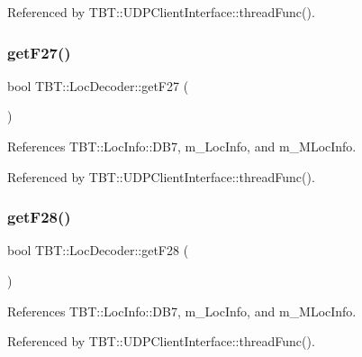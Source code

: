 Referenced by T\+B\+T\+::\+U\+D\+P\+Client\+Interface\+::thread\+Func().

\mbox{\label{classTBT_1_1LocDecoder_a0f8abd84b95094b2a139bd3402153aae_a0f8abd84b95094b2a139bd3402153aae}} 
\subsubsection{\texorpdfstring{get\+F27()}{getF27()}}
{\footnotesize\ttfamily bool T\+B\+T\+::\+Loc\+Decoder\+::get\+F27 (\begin{DoxyParamCaption}{ }\end{DoxyParamCaption})\hspace{0.3cm}{\ttfamily [inline]}}



References T\+B\+T\+::\+Loc\+Info\+::\+D\+B7, m\+\_\+\+Loc\+Info, and m\+\_\+\+M\+Loc\+Info.



Referenced by T\+B\+T\+::\+U\+D\+P\+Client\+Interface\+::thread\+Func().

\mbox{\label{classTBT_1_1LocDecoder_aecb2127b4edc17aac10dda93b4404e1d_aecb2127b4edc17aac10dda93b4404e1d}} 
\subsubsection{\texorpdfstring{get\+F28()}{getF28()}}
{\footnotesize\ttfamily bool T\+B\+T\+::\+Loc\+Decoder\+::get\+F28 (\begin{DoxyParamCaption}{ }\end{DoxyParamCaption})\hspace{0.3cm}{\ttfamily [inline]}}



References T\+B\+T\+::\+Loc\+Info\+::\+D\+B7, m\+\_\+\+Loc\+Info, and m\+\_\+\+M\+Loc\+Info.



Referenced by T\+B\+T\+::\+U\+D\+P\+Client\+Interface\+::thread\+Func().

\mbox{\label{classTBT_1_1LocDecoder_a421ae56808383dbc63de19b21c08fb5d_a421ae56808383dbc63de19b21c08fb5d}} 
